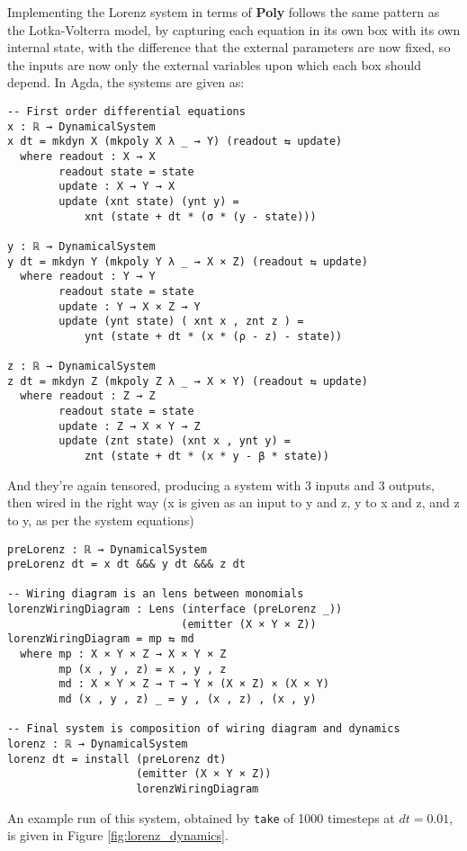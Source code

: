 Implementing the Lorenz system in terms of \textbf{Poly} follows the same pattern as the Lotka-Volterra model, by capturing each equation in its own box with its own internal state, with the difference that the external parameters are now fixed, so the inputs are now only the external variables upon which each box should depend. In Agda, the systems are given as:
\begin{verbatim}
-- First order differential equations
x : ℝ → DynamicalSystem
x dt = mkdyn X (mkpoly X λ _ → Y) (readout ⇆ update)
  where readout : X → X
        readout state = state
        update : X → Y → X
        update (xnt state) (ynt y) = 
            xnt (state + dt * (σ * (y - state)))

y : ℝ → DynamicalSystem
y dt = mkdyn Y (mkpoly Y λ _ → X × Z) (readout ⇆ update)
  where readout : Y → Y
        readout state = state
        update : Y → X × Z → Y
        update (ynt state) ( xnt x , znt z ) = 
            ynt (state + dt * (x * (ρ - z) - state))

z : ℝ → DynamicalSystem
z dt = mkdyn Z (mkpoly Z λ _ → X × Y) (readout ⇆ update)
  where readout : Z → Z
        readout state = state
        update : Z → X × Y → Z
        update (znt state) (xnt x , ynt y) = 
            znt (state + dt * (x * y - β * state))
\end{verbatim}
And they're again tensored, producing a system with 3 inputs and 3 outputs, then wired in the right way (x is given as an input to y and z, y to x and z, and z to y, as per the system equations)

\begin{verbatim}
preLorenz : ℝ → DynamicalSystem
preLorenz dt = x dt &&& y dt &&& z dt

-- Wiring diagram is an lens between monomials
lorenzWiringDiagram : Lens (interface (preLorenz _))
                           (emitter (X × Y × Z))
lorenzWiringDiagram = mp ⇆ md
  where mp : X × Y × Z → X × Y × Z
        mp (x , y , z) = x , y , z
        md : X × Y × Z → ⊤ → Y × (X × Z) × (X × Y)
        md (x , y , z) _ = y , (x , z) , (x , y)

-- Final system is composition of wiring diagram and dynamics
lorenz : ℝ → DynamicalSystem
lorenz dt = install (preLorenz dt)
                    (emitter (X × Y × Z))
                    lorenzWiringDiagram
\end{verbatim}

An example run of this system, obtained by \texttt{take} of 1000 timesteps at $dt = 0.01$, is given in Figure \ref{fig:lorenz_dynamics}.

